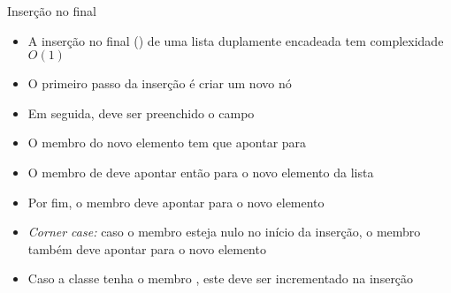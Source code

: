 \begin{frame}[fragile]{Inserção no final}

    \begin{itemize}
        \item A inserção no final () de uma lista duplamente encadeada tem
            complexidade $O(1)$

        \item O primeiro passo da inserção é criar um novo nó

        \item Em seguida, deve ser preenchido o campo 

        \item O membro  do novo elemento tem que apontar para 

        \item O membro  de  deve apontar então para 
        o novo elemento da lista

        \item Por fim, o membro  deve apontar para o novo elemento

        \item \textit{Corner case:} caso o membro  esteja nulo no início da 
            inserção, o membro  também deve apontar para o novo elemento

        \item Caso a classe tenha o membro , este deve ser incrementado
            na inserção
    \end{itemize}

\end{frame}

